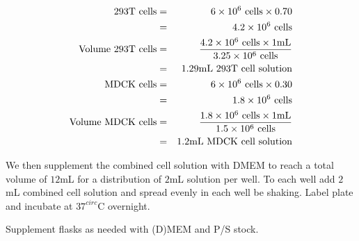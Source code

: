 \begin{eqnarray*}
%
%
\text{293T cells} &=& 6\e{6}\text{ cells} \times 0.70 \\
&=& 4.2\e{6}\text{ cells} \\
\text{Volume 293T cells} &=& \frac{4.2\e{6}\text{ cells} \times 1\text{mL}}{3.25\e{6}\text{ cells}} \\
&=& 1.29\text{mL 293T cell solution} \\
%
%
\text{MDCK cells} &=& 6\e{6}\text{ cells} \times 0.30 \\
&=& 1.8\e{6}\text{ cells} \\
\text{Volume MDCK cells} &=& \frac{1.8\e{6}\text{ cells} \times 1\text{mL}}{1.5\e{6}\text{ cells}} \\
&=& 1.2\text{mL MDCK cell solution} \\
\end{eqnarray*}

We then supplement the combined cell solution with DMEM to reach a total volume of $12$mL for a distribution of $2$mL solution per well. To each well add $2$mL combined cell solution and spread evenly in each well be shaking. Label plate and incubate at $37^{circ}$C overnight.

Supplement flasks as needed with (D)MEM and P/S stock.